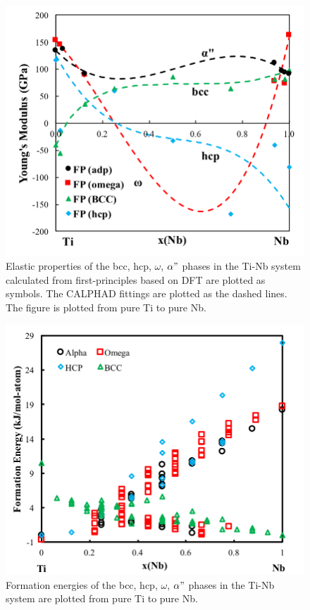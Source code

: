 \pagebreak
\begin{figure}[H]
	\centering
	\includegraphics[width=\textwidth]{Chapter-7/Figures/tinbelastic.png}
	\caption{Elastic properties of the bcc, hcp, $\omega$, $\alpha"$ phases in the Ti-Nb system calculated from first-principles based on DFT are plotted as symbols. The CALPHAD fittings are plotted as the dashed lines. The figure is plotted from pure Ti to pure Nb.}
	\label{Ch7-figure:tinbelastic}
\end{figure}

\pagebreak
\begin{figure}[H]
	\centering
	\includegraphics[width=\textwidth]{Chapter-7/Figures/tinb0k.png}
	\caption{Formation energies of the bcc, hcp, $\omega$, $\alpha"$ phases in the Ti-Nb system are plotted from pure Ti to pure Nb.}
	\label{Ch7-figure:tinb0K}
\end{figure}


